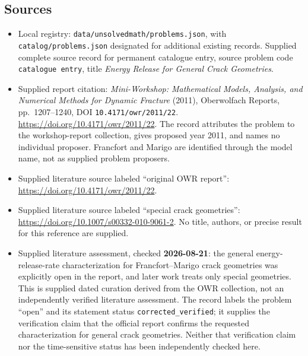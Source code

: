 \documentclass[11pt]{article}
\begin{document}
\subsection{Sources}
\begin{itemize}
\item Local registry: \texttt{data/unsolvedmath/problems.json}, with \texttt{catalog/problems.json} designated for additional existing records. Supplied complete source record for permanent catalogue entry, source problem code \texttt{catalogue entry}, title \emph{Energy Release for General Crack Geometries}.
\item Supplied report citation: \emph{Mini-Workshop: Mathematical Models, Analysis, and Numerical Methods for Dynamic Fracture} (2011), Oberwolfach Reports, pp.~1207--1240, DOI \texttt{10.4171/owr/2011/22}. \url{https://doi.org/10.4171/owr/2011/22}. The record attributes the problem to the workshop-report collection, gives proposed year 2011, and names no individual proposer. Francfort and Marigo are identified through the model name, not as supplied problem proposers.
\item Supplied literature source labeled ``original OWR report'': \url{https://doi.org/10.4171/owr/2011/22}.
\item Supplied literature source labeled ``special crack geometries'': \url{https://doi.org/10.1007/s00332-010-9061-2}. No title, authors, or precise result for this reference are supplied.
\item Supplied literature assessment, checked \textbf{2026-08-21}: the general energy-release-rate characterization for Francfort--Marigo crack geometries was explicitly open in the report, and later work treats only special geometries. This is supplied dated curation derived from the OWR collection, not an independently verified literature assessment. The record labels the problem ``open'' and its statement status \texttt{corrected\_verified}; it supplies the verification claim that the official report confirms the requested characterization for general crack geometries. Neither that verification claim nor the time-sensitive status has been independently checked here.
\end{itemize}
\end{document}
